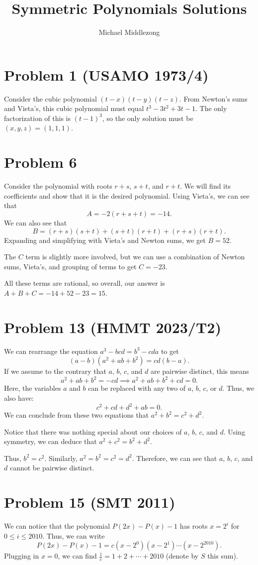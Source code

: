 \documentclass{scrartcl}
\title{Symmetric Polynomials Solutions}
\author{Michael Middlezong}
\begin{document}
\maketitle
\section*{Problem 1 (USAMO 1973/4)}
Consider the cubic polynomial $(t - x)(t - y)(t - z)$. From Newton's sums and Vieta's, this cubic polynomial must equal $t^3 - 3t^2 + 3t - 1$. The only factorization of this is $(t - 1)^3$, so the only solution must be $(x,y,z)=(1,1,1)$.

\section*{Problem 6}
Consider the polynomial with roots $r + s$, $s + t$, and $r + t$. We will find its coefficients and show that it is the desired polynomial.
Using Vieta's, we can see that
\[
    A = -2(r + s + t) = -14.
\]
We can also see that
\[
    B = (r + s)(s + t) + (s + t)(r + t) + (r + s)(r + t).
\]
Expanding and simplifying with Vieta's and Newton sums, we get $B = 52$.

The $C$ term is slightly more involved, but we can use a combination of Newton sums, Vieta's, and grouping of terms to get $C = -23$.

All these terms are rational, so overall, our answer is $A + B + C = -14 + 52 - 23 = 15$.
\section*{Problem 13 (HMMT 2023/T2)}
We can rearrange the equation $a^3 - bcd = b^3 - cda$ to get
\[
    (a - b)(a^2 + ab + b^2) = cd(b - a).
\]
If we assume to the contrary that $a$, $b$, $c$, and $d$ are pairwise distinct, this means
\[
    a^2 + ab + b^2 = -cd \implies a^2 + ab + b^2 + cd = 0.
\]
Here, the variables $a$ and $b$ can be replaced with any two of $a$, $b$, $c$, or $d$. Thus, we also have:
\[
    c^2 + cd + d^2 + ab = 0.
\]
We can conclude from these two equations that $a^2 + b^2 = c^2 + d^2$.

Notice that there was nothing special about our choices of $a$, $b$, $c$, and $d$. Using symmetry, we can deduce that $a^2 + c^2 = b^2 + d^2$.

Thus, $b^2 = c^2$. Similarly, $a^2 = b^2 = c^2 = d^2$. Therefore, we can see that $a$, $b$, $c$, and $d$ cannot be pairwise distinct.
\section*{Problem 15 (SMT 2011)}
We can notice that the polynomial $P(2x) - P(x) - 1$ has roots $x = 2^i$ for $0 \leq i \leq 2010$.
Thus, we can write
\[
    P(2x) - P(x) - 1 = c(x - 2^0)(x - 2^1)\cdots(x - 2^{2010}).
\]
Plugging in $x = 0$, we can find $\frac{1}{c} = 1 + 2 + \cdots + 2010$ (denote by $S$ this sum).
\end{document}
